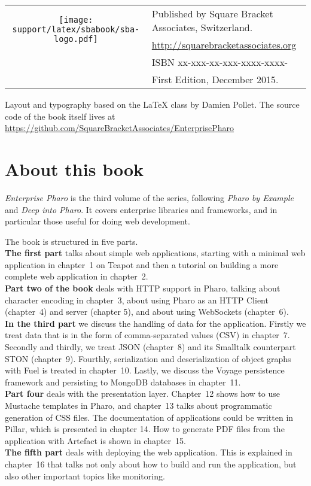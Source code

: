 \documentclass[10pt,twoside,english,showtrims]{support/latex/sbabook/sbabook}
\begin{document}
{  \vfill

  \begin{tabular}{@{}c@{\quad}l}
    \multirow{2}{*}{\texttt{[image: support/latex/sbabook/sba-logo.pdf]}}
    & Published by Square Bracket Associates, Switzerland. \\
    & \url{http://squarebracketassociates.org} \\[\smallskipamount]
    & ISBN xx-xxx-xx-xxx-xxxx-xxxx- \\
    & First Edition, December 2015. \\
  \end{tabular}
  \medskip

  Layout and typography based on the  \LaTeX{} class by Damien Pollet.
  The source code of the book itself lives at
  \url{https://github.com/SquareBracketAssociates/EnterprisePharo}
}


\frontmatter
\pagestyle{plain}


\chapter*{About this book}

\emph{Enterprise Pharo} is the third volume of the series, following
\emph{Pharo by Example} and \emph{Deep into Pharo}. It covers
enterprise libraries and frameworks, and in particular those useful for
doing web development.

The book is structured in five parts.\\
\textbf{The first part} talks about simple web applications, starting
with a minimal web application in chapter~1 on Teapot and then a
tutorial on building a more complete web application in chapter~2.\\
\textbf{Part two of the book} deals with HTTP support in Pharo,
talking about character encoding in chapter~3, about using Pharo as an
HTTP Client (chapter~4) and server (chapter 5), and about using
WebSockets (chapter~6).\\
\textbf{In the third part} we discuss the handling of data for the application.
Firstly we treat data that is in the form of comma-separated values (CSV) in
chapter~7. Secondly and thirdly, we treat JSON (chapter~8) and its Smalltalk
counterpart STON (chapter~9). Fourthly, serialization and deserialization of
object graphs with Fuel is treated in chapter~10. Lastly, we discuss the Voyage
persistence framework and persisting to MongoDB databases in chapter~11.\\
\textbf{Part four} deals with the presentation layer. Chapter~12 shows how to
use Mustache templates in Pharo, and chapter~13 talks about programmatic
generation of CSS files. The documentation of applications could be written in
Pillar, which is presented in chapter 14. How to generate PDF files from the
application with Artefact is shown in chapter~15.\\
\textbf{The fifth part} deals with deploying the web application. This is
explained in chapter~16 that talks not only about how to build and run the
application, but also other important topics like monitoring.
\end{document}
